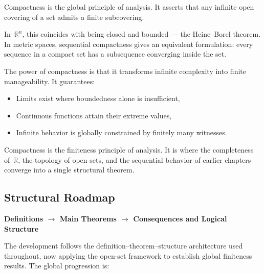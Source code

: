 \begin{tcolorbox}[
  colback=gray!6,
  colframe=gray!40,
  arc=2pt,
  left=8pt, right=8pt, top=6pt, bottom=6pt,
  title={\small\textbf{Structural Role: Finiteness — Infinite Behavior with Finite Control}},
  fonttitle=\small\bfseries
]
Compactness is the global principle of analysis.
It asserts that any infinite open covering of a set
admits a finite subcovering.

In~$\mathbb{R}^n$, this coincides with being closed and bounded
--- the Heine--Borel theorem.
In metric spaces, sequential compactness gives an equivalent
formulation: every sequence in a compact set has a subsequence
converging inside the set.

The power of compactness is that it transforms infinite complexity
into finite manageability.
It guarantees:

\begin{itemize}
  \item Limits exist where boundedness alone is insufficient,
  \item Continuous functions attain their extreme values,
  \item Infinite behavior is globally constrained by finitely many
        witnesses.
\end{itemize}

Compactness is the finiteness principle of analysis.
It is where the completeness of~$\mathbb{R}$, the topology of open
sets, and the sequential behavior of earlier chapters converge
into a single structural theorem.
\end{tcolorbox}
\vspace{1em}

\subsection*{Structural Roadmap}

\begin{center}
\textbf{Definitions $\longrightarrow$ Main Theorems
$\longrightarrow$ Consequences and Logical Structure}
\end{center}

The development follows the definition--theorem--structure
architecture used throughout, now applying the open-set framework
to establish global finiteness results.
The global progression is:

